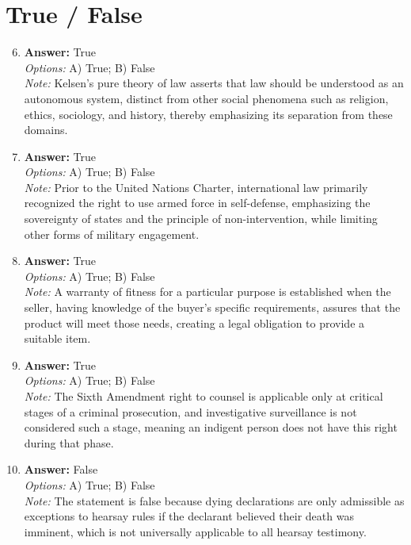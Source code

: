 \documentclass[12pt]{article}
\begin{document}
\section*{True / False}
\begin{enumerate}[label=\arabic*.]
\setcounter{enumi}{5}
\item \textbf{Answer:} True
\\ \textit{Options:} A) True; B) False
\\ \textit{Note:} Kelsen's pure theory of law asserts that law should be understood as an autonomous system, distinct from other social phenomena such as religion, ethics, sociology, and history, thereby emphasizing its separation from these domains.
\item \textbf{Answer:} True
\\ \textit{Options:} A) True; B) False
\\ \textit{Note:} Prior to the United Nations Charter, international law primarily recognized the right to use armed force in self-defense, emphasizing the sovereignty of states and the principle of non-intervention, while limiting other forms of military engagement.
\item \textbf{Answer:} True
\\ \textit{Options:} A) True; B) False
\\ \textit{Note:} A warranty of fitness for a particular purpose is established when the seller, having knowledge of the buyer's specific requirements, assures that the product will meet those needs, creating a legal obligation to provide a suitable item.
\item \textbf{Answer:} True
\\ \textit{Options:} A) True; B) False
\\ \textit{Note:} The Sixth Amendment right to counsel is applicable only at critical stages of a criminal prosecution, and investigative surveillance is not considered such a stage, meaning an indigent person does not have this right during that phase.
\item \textbf{Answer:} False
\\ \textit{Options:} A) True; B) False
\\ \textit{Note:} The statement is false because dying declarations are only admissible as exceptions to hearsay rules if the declarant believed their death was imminent, which is not universally applicable to all hearsay testimony.
\end{enumerate}
\end{document}
